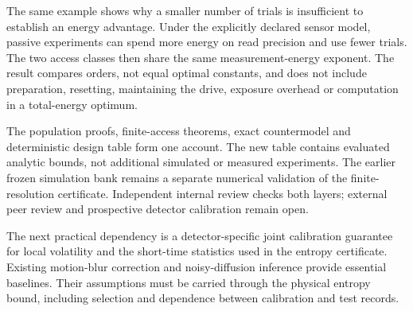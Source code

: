 The same example shows why a smaller number of trials is insufficient to
establish an energy advantage. Under the explicitly declared sensor model,
passive experiments can spend more energy on read precision and use fewer
trials. The two access classes then share the same measurement-energy
exponent. The result compares orders, not equal optimal constants, and
does not include preparation, resetting, maintaining the drive, exposure
overhead or computation in a total-energy optimum.

The population proofs, finite-access theorems, exact countermodel and
deterministic design table form one account. The new table contains evaluated
analytic bounds, not additional simulated or measured experiments. The
earlier frozen simulation bank remains a separate numerical validation of
the finite-resolution certificate. Independent internal review checks both
layers; external peer review and prospective detector calibration remain
open.

The next practical dependency is a detector-specific joint calibration
guarantee for local volatility and the short-time statistics used in the
entropy certificate. Existing motion-blur correction and noisy-diffusion
inference provide essential baselines. Their assumptions must be carried
through the physical entropy bound, including selection and dependence
between calibration and test records.
